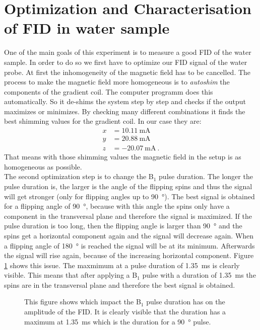 \section{Optimization and Characterisation of FID in water sample}
\label{sec:OptimizationandCharacterisationofFIDinwatersample}

One of the main goals of this experiment is to measure a good FID of the water sample.
In order to do so we first have to optimize our FID signal of the water probe.\newline
At first the inhomogeneity of the magnetic field has to be cancelled.
The process to make the magnetic field more homogeneous is to \textit{autoshim} the components of the gradient coil.
The computer programm does this automatically. So it de-shims the system step by step and checks if the output maximizes or minimizes.
By checking many different combinations it finds the best shimming values for the gradient coil.
In our case they are:
\begin{align*}
    x &= \SI{10.11}{\milli \ampere}\\
    y &= \SI{20.88}{\milli \ampere}\\
    z &= \SI{-20.07}{\milli \ampere} \ .
    \label{eq: shimmingvalues}
\end{align*}
That means with those shimming values the magnetic field in the setup is as homogeneous as possible.
\\
The second optimization step is to change the B$_1$ pulse duration.
The longer the pulse duration is, the larger is the angle of the flipping spins and thus the signal will get stronger (only for flipping angles up to \SI{90}{\degree}).
The best signal is obtained for a flipping angle of \SI{90}{\degree}, because with this angle the spins only have a component in the transversal plane and therefore the signal is maximized.
If the pulse duration is too long, then the flipping angle is larger than \SI{90}{\degree} and the spins get a horizontal component again and the signal will decrease again.
When a flipping angle of \SI{180}{\degree} is reached the signal will be at its minimum.
Afterwards the signal will rise again, because of the increasing horizontal component.
Figure \ref{fig:B1dauer} shows this issue.
The maxmimum at a pulse duration of \SI{1.35}{\milli \second} is clearly visible.
This means that after applying a B$_1$ pulse with a duration of \SI{1.35}{\milli \second} the spins are in the transversal plane and therefore the best signal is obtained.
\begin{figure}[H]
    \centering
    
    \caption[This figure shows which impact the B$_1$ pulse duration has on the amplitude of the FID.]{This figure shows which impact the B$_1$ pulse duration has on the amplitude of the FID.
    It is clearly visible that the duration has a maximum at \SI{1.35}{\milli \second} which is the duration for a \SI{90}{\degree} pulse.}
    \label{fig:B1dauer}
\end{figure}
